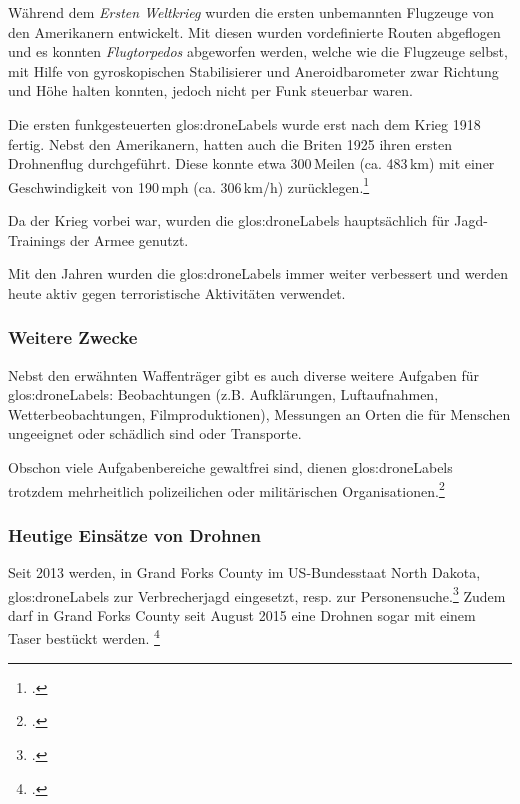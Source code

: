 Während dem \textit{Ersten Weltkrieg} wurden die ersten unbemannten Flugzeuge von den Amerikanern entwickelt.
Mit diesen wurden vordefinierte Routen abgeflogen und es konnten \textit{Flugtorpedos} abgeworfen werden, welche wie die Flugzeuge selbst, mit Hilfe von gyroskopischen Stabilisierer und Aneroidbarometer zwar Richtung und Höhe halten konnten, jedoch nicht per Funk steuerbar waren.

Die ersten funkgesteuerten \glspl{glos:droneLabel} wurde erst nach dem Krieg 1918 fertig.
Nebst den Amerikanern, hatten auch die Briten 1925 ihren ersten Drohnenflug durchgeführt. Diese konnte etwa 300\,Meilen (ca. 483\,km) mit einer Geschwindigkeit von 190\,mph (ca. 306\,km/h) zurücklegen.\footcite{Informatik_und_Gesellschaft_2015-03-21}

Da der Krieg vorbei war, wurden die \glspl{glos:droneLabel} hauptsächlich für Jagd-Trainings der Armee genutzt.

Mit den Jahren wurden die \glspl{glos:droneLabel} immer weiter verbessert und werden heute aktiv gegen terroristische Aktivitäten verwendet.

\subsubsection{Weitere Zwecke}
Nebst den erwähnten Waffenträger gibt es auch diverse weitere Aufgaben für \glspl{glos:droneLabel}: Beobachtungen (z.B. Aufklärungen, Luftaufnahmen, Wetterbeobachtungen, Filmproduktionen), Messungen an Orten die für Menschen ungeeignet oder schädlich sind oder Transporte.

Obschon viele Aufgabenbereiche gewaltfrei sind, dienen \glspl{glos:droneLabel} trotzdem mehrheitlich polizeilichen oder militärischen Organisationen.\footcite{Die_Geschichte_der_Drohnen_DiePresse.com_2015-03-21}

\subsubsection{Heutige Einsätze von Drohnen}
Seit 2013 werden, in Grand Forks County im US-Bundesstaat North Dakota, \glspl{glos:droneLabel} zur Verbrecherjagd eingesetzt, resp. zur Personensuche.\footcite{Grand_Forks_Drone_Assisted_Policing_2015-08-28}
Zudem darf in Grand Forks County seit August 2015 eine Drohnen sogar mit einem Taser bestückt werden. \footcite{First_State_Legalizes_Taser_Drones_for_Cops_Thanks_to_a_Lobbyist_The_Daily_Beast_2015-08-28}

